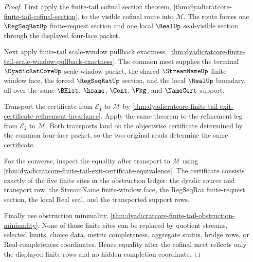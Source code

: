 \begin{proof}
First apply the finite-tail cofinal section theorem, \autoref{thm:dyadicratcore-finite-tail-cofinal-section}, to the visible cofinal route into $\mathcal M$. The route forces one $\RegSeqRatUp$ finite-request section and one local $\RealUp$ seal-visible section through the displayed four-face packet.

Next apply finite-tail scale-window pullback exactness, \autoref{thm:dyadicratcore-finite-tail-scale-window-pullback-exactness}. The common meet supplies the terminal $\DyadicRatCoreUp$ scale-window packet, the shared $\StreamNameUp$ finite-window face, the forced $\RegSeqRatUp$ section, and the local $\RealUp$ boundary, all over the same $\BHist$, $\hsame$, $\Cont$, $\Pkg$, and $\NameCert$ support.

Transport the certificate from $\mathcal E_1$ to $\mathcal M$ by \autoref{thm:dyadicratcore-finite-tail-exit-certificate-refinement-invariance}. Apply the same theorem to the refinement leg from $\mathcal E_2$ to $\mathcal M$. Both transports land on the objectwise certificate determined by the common four-face packet, so the two original reads determine the same certificate.

For the converse, inspect the equality after transport to $\mathcal M$ using \autoref{thm:dyadicratcore-finite-tail-exit-certificate-equivalence}. The certificate consists exactly of the five finite sites in the obstruction ledger: the dyadic source and transport row, the StreamName finite-window face, the RegSeqRat finite-request section, the local Real seal, and the transported support rows.

Finally use obstruction minimality, \autoref{thm:dyadicratcore-finite-tail-obstruction-minimality}. None of those finite sites can be replaced by quotient streams, selected limits, choice data, metric completeness, aggregate status, bridge rows, or Real-completeness coordinates. Hence equality after the cofinal meet reflects only the displayed finite rows and no hidden completion coordinate.
\end{proof}


